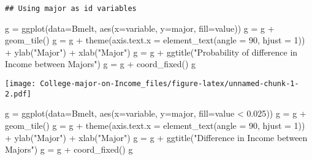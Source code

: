 \documentclass[
]{article}
\newenvironment{Shaded}{\begin{snugshade}}{\end{snugshade}}
\newcommand{\AttributeTok}[1]{\textcolor[rgb]{0.77,0.63,0.00}{#1}}
\newcommand{\DecValTok}[1]{\textcolor[rgb]{0.00,0.00,0.81}{#1}}
\newcommand{\FloatTok}[1]{\textcolor[rgb]{0.00,0.00,0.81}{#1}}
\newcommand{\FunctionTok}[1]{\textcolor[rgb]{0.00,0.00,0.00}{#1}}
\newcommand{\NormalTok}[1]{#1}
\newcommand{\OtherTok}[1]{\textcolor[rgb]{0.56,0.35,0.01}{#1}}
\newcommand{\SpecialCharTok}[1]{\textcolor[rgb]{0.00,0.00,0.00}{#1}}
\newcommand{\StringTok}[1]{\textcolor[rgb]{0.31,0.60,0.02}{#1}}
\begin{document}
\begin{verbatim}
## Using major as id variables
\end{verbatim}

\begin{Shaded}
\begin{Highlighting}[]
\NormalTok{g }\OtherTok{=} \FunctionTok{ggplot}\NormalTok{(}\AttributeTok{data=}\NormalTok{Bmelt, }\FunctionTok{aes}\NormalTok{(}\AttributeTok{x=}\NormalTok{variable, }\AttributeTok{y=}\NormalTok{major, }\AttributeTok{fill=}\NormalTok{value))}
\NormalTok{g }\OtherTok{=}\NormalTok{ g }\SpecialCharTok{+} \FunctionTok{geom\_tile}\NormalTok{()}
\NormalTok{g }\OtherTok{=}\NormalTok{ g }\SpecialCharTok{+} \FunctionTok{theme}\NormalTok{(}\AttributeTok{axis.text.x =} \FunctionTok{element\_text}\NormalTok{(}\AttributeTok{angle =} \DecValTok{90}\NormalTok{, }\AttributeTok{hjust =} \DecValTok{1}\NormalTok{)) }\SpecialCharTok{+} \FunctionTok{ylab}\NormalTok{(}\StringTok{"Major"}\NormalTok{) }\SpecialCharTok{+} \FunctionTok{xlab}\NormalTok{(}\StringTok{"Major"}\NormalTok{)}
\NormalTok{g }\OtherTok{=}\NormalTok{ g }\SpecialCharTok{+} \FunctionTok{ggtitle}\NormalTok{(}\StringTok{"Probability of difference in Income between Majors"}\NormalTok{)}
\NormalTok{g }\OtherTok{=}\NormalTok{ g }\SpecialCharTok{+} \FunctionTok{coord\_fixed}\NormalTok{()}
\NormalTok{g}
\end{Highlighting}
\end{Shaded}

\texttt{[image: College-major-on-Income\_files/figure-latex/unnamed-chunk-1-2.pdf]}

\begin{Shaded}
\begin{Highlighting}[]
\NormalTok{g }\OtherTok{=} \FunctionTok{ggplot}\NormalTok{(}\AttributeTok{data=}\NormalTok{Bmelt, }\FunctionTok{aes}\NormalTok{(}\AttributeTok{x=}\NormalTok{variable, }\AttributeTok{y=}\NormalTok{major, }\AttributeTok{fill=}\NormalTok{value }\SpecialCharTok{\textless{}} \FloatTok{0.025}\NormalTok{))}
\NormalTok{g }\OtherTok{=}\NormalTok{ g }\SpecialCharTok{+} \FunctionTok{geom\_tile}\NormalTok{()}
\NormalTok{g }\OtherTok{=}\NormalTok{ g }\SpecialCharTok{+} \FunctionTok{theme}\NormalTok{(}\AttributeTok{axis.text.x =} \FunctionTok{element\_text}\NormalTok{(}\AttributeTok{angle =} \DecValTok{90}\NormalTok{, }\AttributeTok{hjust =} \DecValTok{1}\NormalTok{)) }\SpecialCharTok{+} \FunctionTok{ylab}\NormalTok{(}\StringTok{"Major"}\NormalTok{) }\SpecialCharTok{+} \FunctionTok{xlab}\NormalTok{(}\StringTok{"Major"}\NormalTok{)}
\NormalTok{g }\OtherTok{=}\NormalTok{ g }\SpecialCharTok{+} \FunctionTok{ggtitle}\NormalTok{(}\StringTok{"Difference in Income between Majors"}\NormalTok{)}
\NormalTok{g }\OtherTok{=}\NormalTok{ g }\SpecialCharTok{+} \FunctionTok{coord\_fixed}\NormalTok{()}
\NormalTok{g}
\end{Highlighting}
\end{Shaded}
\end{document}
